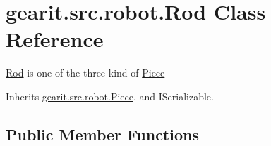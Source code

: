 \hypertarget{classgearit_1_1src_1_1robot_1_1_rod}{\section{gearit.\+src.\+robot.\+Rod Class Reference}
\label{classgearit_1_1src_1_1robot_1_1_rod}
}


\hyperlink{classgearit_1_1src_1_1robot_1_1_rod}{Rod} is one of the three kind of \hyperlink{classgearit_1_1src_1_1robot_1_1_piece}{Piece}  




Inherits \hyperlink{classgearit_1_1src_1_1robot_1_1_piece}{gearit.\+src.\+robot.\+Piece}, and I\+Serializable.

\subsection*{Public Member Functions}
